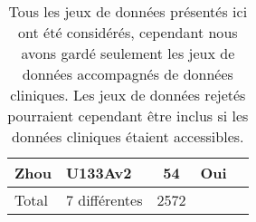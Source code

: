 \begin{table}
\begin{center}
\begin{tabular}{llccc}
            Zhou                  & U133Av2                         & 54                     & Oui                   \\
            \midrule
            Total                 & 7 différentes                   & 2572                   &                       \\
            \bottomrule
          \end{tabular}
          \label{tab:MetDatasets}
          \vspace{5ex}
          \caption*{Tous les jeux de données présentés ici ont été considérés, cependant nous avons gardé seulement les jeux de données accompagnés de données cliniques. Les jeux de données rejetés pourraient cependant être inclus si les données cliniques étaient accessibles.}
        \end{center}
      \end{table}

